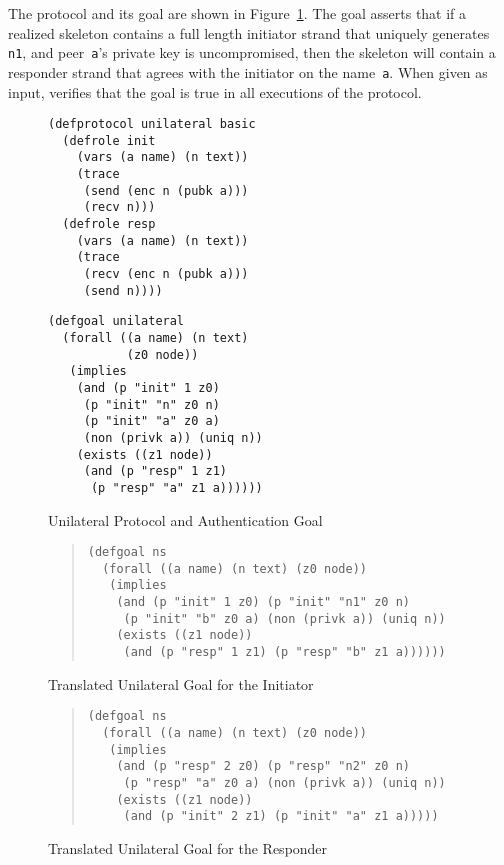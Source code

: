 \documentclass[12pt]{article}
\begin{document}
The protocol and its goal are shown in Figure~\ref{fig:unilateral}.
The goal asserts that if a realized skeleton contains a full length
initiator strand that uniquely generates \texttt{n1}, and
peer~\texttt{a}'s private key is uncompromised, then the skeleton will
contain a responder strand that agrees with the initiator on the
name~\texttt{a}.  When given as input, {\cpsa} verifies that the goal
is true in all executions of the protocol.

\begin{figure}
\begin{minipage}{2.7in}
\begin{verbatim}
(defprotocol unilateral basic
  (defrole init
    (vars (a name) (n text))
    (trace
     (send (enc n (pubk a)))
     (recv n)))
  (defrole resp
    (vars (a name) (n text))
    (trace
     (recv (enc n (pubk a)))
     (send n))))
\end{verbatim}
\end{minipage}\hfil
\begin{minipage}{3.0in}
\begin{verbatim}
(defgoal unilateral
  (forall ((a name) (n text)
           (z0 node))
   (implies
    (and (p "init" 1 z0)
     (p "init" "n" z0 n)
     (p "init" "a" z0 a)
     (non (privk a)) (uniq n))
    (exists ((z1 node))
     (and (p "resp" 1 z1)
      (p "resp" "a" z1 a))))))
\end{verbatim}
\end{minipage}
\caption{Unilateral Protocol and Authentication Goal}\label{fig:unilateral}
\end{figure}

\begin{figure}
\begin{quote}
\begin{verbatim}
(defgoal ns
  (forall ((a name) (n text) (z0 node))
   (implies
    (and (p "init" 1 z0) (p "init" "n1" z0 n)
     (p "init" "b" z0 a) (non (privk a)) (uniq n))
    (exists ((z1 node))
     (and (p "resp" 1 z1) (p "resp" "b" z1 a))))))
\end{verbatim}
\end{quote}
\caption{Translated Unilateral Goal for the
  Initiator}\label{fig:unilateral ns init}
\end{figure}

\begin{figure}
\begin{quote}
\begin{verbatim}
(defgoal ns
  (forall ((a name) (n text) (z0 node))
   (implies
    (and (p "resp" 2 z0) (p "resp" "n2" z0 n)
     (p "resp" "a" z0 a) (non (privk a)) (uniq n))
    (exists ((z1 node))
     (and (p "init" 2 z1) (p "init" "a" z1 a)))))
\end{verbatim}
\end{quote}
\caption{Translated Unilateral Goal for the
  Responder}\label{fig:unilateral ns resp}
\end{figure}
\end{document}
